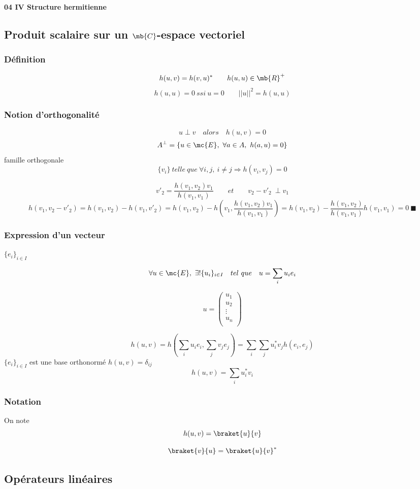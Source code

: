 
{\bf 04 IV Structure hermitienne}

\subsection{Produit scalaire sur un $\mb{C}$-espace vectoriel} %
\subsubsection{Définition}
\[
h(u,v)=h(v,u)^*\qquad h(u,u)\in\mb{R}^+
\]
\[
h(u,u)=0\ ssi\ u=0\qquad||u||^2=h(u,u)
\]
\subsubsection{Notion d'orthogonalité}
\[
u \perp v \quad alors\quad h(u,v)=0
\]
\[
A^\perp = \{u\in\mc{E},\ \forall a \in A,\ h(a,u)=0\}
\]
famille orthogonale
\[
\{v_i\}\ telle\ que\ \forall i,j,\ i\neq j \Rightarrow h(v_i,v_j)=0
\]

\[
v'_2=\frac{h(v_1,v_2)v_1}{h(v_1,v_1)}\qquad et\qquad v_2-v'_2\ \perp v_1
\]
{\footnotesize\[
h(v_1,v_2-v'_2)=h(v_1,v_2)-h(v_1,v'_2)=
h(v_1,v_2)-h(v_1,\frac{h(v_1,v_2)v_1}{h(v_1,v_1)})=
h(v_1,v_2)-\frac{h(v_1,v_2)}{h(v_1,v_1)}h(v_1,v_1)=0\ \blacksquare
\]}

\subsubsection{Expression d'un vecteur}
$\{e_i\}_{i\in I}$

\[
\forall u\in\mc{E},\ \exists!\{u_i\}_{i\in I}\quad tel\ que\quad u=\sum_iu_ie_i
\]

\[u=
\left(\begin{array}{ c }
 u_1 \\ u_2 \\ \vdots \\ u_n \\
\end{array}\right)
\]

\[
h(u,v)=h(\sum_iu_ie_i,\sum_jv_je_j)=\sum_i\sum_ju_i^*v_jh(e_i,e_j)
\]
$\{e_i\}_{i\in I}$ est une base orthonormé $h(u,v)=\delta_{ij}$
\[
\boxed{h(u,v)=\sum_iu_i^*v_i}
\]

\subsubsection{Notation}
On note 
\[
h(u,v)=\braket{u}{v}
\]

\[
\braket{v}{u}=\braket{u}{v}^*
\]
\subsection{Opérateurs linéaires} %
